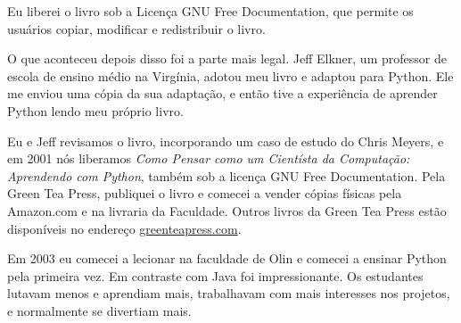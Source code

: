 Eu liberei o livro sob a Licença GNU Free Documentation, que permite os 
usuários copiar, modificar e redistribuir o livro.



O que aconteceu depois disso foi a parte mais legal. Jeff Elkner, um 
professor de escola de ensino médio na Virgínia, adotou meu livro e adaptou 
para Python. Ele me enviou uma cópia da sua adaptação, e então tive a 
experiência de aprender Python lendo meu próprio livro.


Eu e Jeff revisamos o livro, incorporando um caso de estudo do Chris Meyers, 
e em 2001 nós liberamos \emph{Como Pensar como um Cientísta da Computação: 
Aprendendo com Python}, também sob a licença GNU Free Documentation.
Pela Green Tea Press, publiquei o livro e comecei a vender cópias físicas 
pela Amazon.com e na livraria da Faculdade. Outros livros da Green Tea Press 
estão disponíveis no endereço \url{greenteapress.com}.


Em 2003 eu comecei a lecionar na faculdade de Olin e comecei a ensinar Python 
pela primeira vez. Em contraste com Java foi impressionante. Os estudantes 
lutavam menos e aprendiam mais, trabalhavam com mais interesses nos projetos,
e normalmente se divertiam mais.


